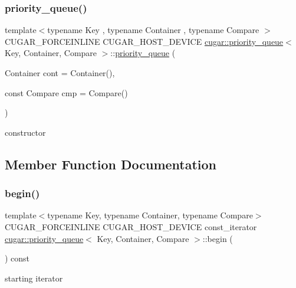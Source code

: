\subsubsection{\texorpdfstring{priority\+\_\+queue()}{priority\_queue()}}
{\footnotesize\ttfamily template$<$typename Key , typename Container , typename Compare $>$ \\
C\+U\+G\+A\+R\+\_\+\+F\+O\+R\+C\+E\+I\+N\+L\+I\+NE C\+U\+G\+A\+R\+\_\+\+H\+O\+S\+T\+\_\+\+D\+E\+V\+I\+CE \hyperlink{structcugar_1_1priority__queue}{cugar\+::priority\+\_\+queue}$<$ Key, Container, Compare $>$\+::\hyperlink{structcugar_1_1priority__queue}{priority\+\_\+queue} (\begin{DoxyParamCaption}\item[{Container}]{cont = {\ttfamily Container()},  }\item[{const Compare}]{cmp = {\ttfamily Compare()} }\end{DoxyParamCaption})}

constructor 

\subsection{Member Function Documentation}
\mbox{\label{structcugar_1_1priority__queue_a9311ca225c87bcb2b5681cd10f033881}} 
\subsubsection{\texorpdfstring{begin()}{begin()}\hspace{0.1cm}{\footnotesize\ttfamily [1/2]}}
{\footnotesize\ttfamily template$<$typename Key, typename Container, typename Compare$>$ \\
C\+U\+G\+A\+R\+\_\+\+F\+O\+R\+C\+E\+I\+N\+L\+I\+NE C\+U\+G\+A\+R\+\_\+\+H\+O\+S\+T\+\_\+\+D\+E\+V\+I\+CE const\+\_\+iterator \hyperlink{structcugar_1_1priority__queue}{cugar\+::priority\+\_\+queue}$<$ Key, Container, Compare $>$\+::begin (\begin{DoxyParamCaption}{ }\end{DoxyParamCaption}) const\hspace{0.3cm}{\ttfamily [inline]}}

starting iterator \mbox{\label{structcugar_1_1priority__queue_a5b3729e96e1f4e05bf2f7e08f0c821b0}} 
